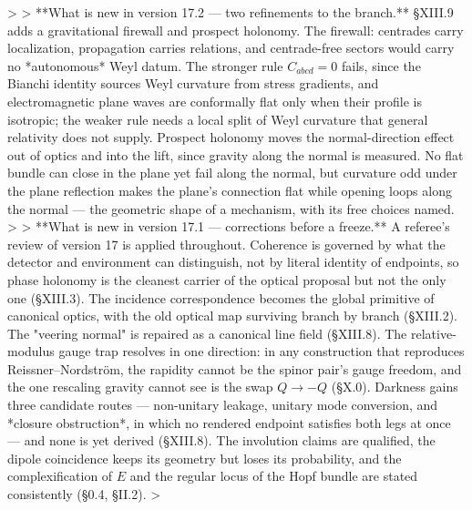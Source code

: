 >
> **What is new in version 17.2 — two refinements to the branch.** §XIII.9 adds a gravitational firewall and prospect holonomy. The firewall: centrades carry localization, propagation carries relations, and centrade-free sectors would carry no *autonomous* Weyl datum. The stronger rule $C_{abcd} = 0$ fails, since the Bianchi identity sources Weyl curvature from stress gradients, and electromagnetic plane waves are conformally flat only when their profile is isotropic; the weaker rule needs a local split of Weyl curvature that general relativity does not supply. Prospect holonomy moves the normal-direction effect out of optics and into the lift, since gravity along the normal is measured. No flat bundle can close in the plane yet fail along the normal, but curvature odd under the plane reflection makes the plane's connection flat while opening loops along the normal — the geometric shape of a mechanism, with its free choices named.
>
> **What is new in version 17.1 — corrections before a freeze.** A referee's review of version 17 is applied throughout. Coherence is governed by what the detector and environment can distinguish, not by literal identity of endpoints, so phase holonomy is the cleanest carrier of the optical proposal but not the only one (§XIII.3). The incidence correspondence becomes the global primitive of canonical optics, with the old optical map surviving branch by branch (§XIII.2). The "veering normal" is repaired as a canonical line field (§XIII.8). The relative-modulus gauge trap resolves in one direction: in any construction that reproduces Reissner–Nordström, the rapidity cannot be the spinor pair's gauge freedom, and the one rescaling gravity cannot see is the swap $Q\to-Q$ (§X.0). Darkness gains three candidate routes — non-unitary leakage, unitary mode conversion, and *closure obstruction*, in which no rendered endpoint satisfies both legs at once — and none is yet derived (§XIII.8). The involution claims are qualified, the dipole coincidence keeps its geometry but loses its probability, and the complexification of $E$ and the regular locus of the Hopf bundle are stated consistently (§0.4, §II.2).
>

